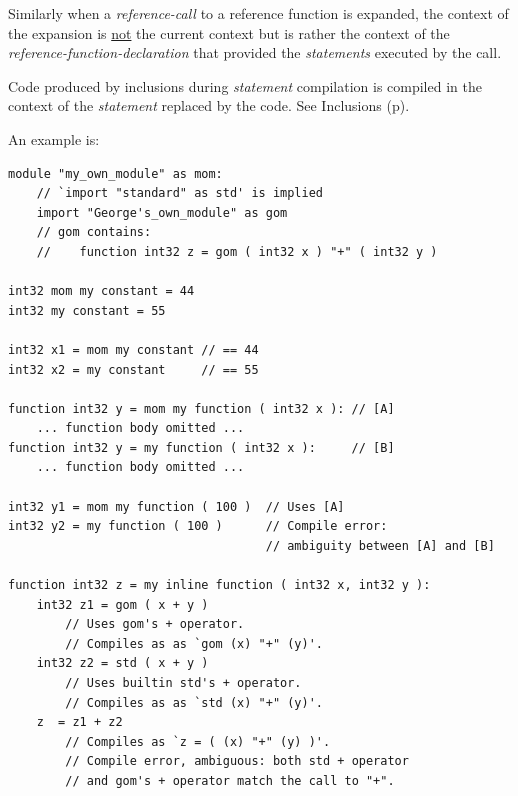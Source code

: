 \documentclass[12pt]{article}
\newcommand{\pagref}[1]{p\pageref{#1}}
\newenvironment{indpar}[1][0.3in]%
	{\begin{list}{}%
		     {\setlength{\itemsep}{0in}%
		      \setlength{\topsep}{0in}%
		      \setlength{\parsep}{1ex}%
		      \setlength{\labelwidth}{#1}%
		      \setlength{\leftmargin}{#1}%
		      \addtolength{\leftmargin}{\labelsep}}%
	 \item}%
	{\end{list}}
\begin{document}
Similarly when a {\em reference-call} to a reference function is expanded,
the context of the expansion is \underline{not} the current context but
is rather the context of the {\em reference-function-declaration}
that provided the {\em statements} executed by the call.

Code produced by inclusions during {\em statement} compilation
is compiled in the context of the {\em statement} replaced by the
code.  See Inclusions (\pagref{INCLUSIONS}).

An example is:
\begin{indpar}\begin{verbatim}
module "my_own_module" as mom:
    // `import "standard" as std' is implied
    import "George's_own_module" as gom
    // gom contains:
    //    function int32 z = gom ( int32 x ) "+" ( int32 y )

int32 mom my constant = 44
int32 my constant = 55

int32 x1 = mom my constant // == 44
int32 x2 = my constant     // == 55

function int32 y = mom my function ( int32 x ): // [A]
    ... function body omitted ...
function int32 y = my function ( int32 x ):     // [B]
    ... function body omitted ...

int32 y1 = mom my function ( 100 )  // Uses [A]
int32 y2 = my function ( 100 )      // Compile error:
                                    // ambiguity between [A] and [B]

function int32 z = my inline function ( int32 x, int32 y ):
    int32 z1 = gom ( x + y )
        // Uses gom's + operator.
        // Compiles as as `gom (x) "+" (y)'.
    int32 z2 = std ( x + y )
        // Uses builtin std's + operator.
        // Compiles as as `std (x) "+" (y)'.
    z  = z1 + z2
        // Compiles as `z = ( (x) "+" (y) )'.
        // Compile error, ambiguous: both std + operator
        // and gom's + operator match the call to "+".
\end{verbatim}\end{indpar}\label{EXTERNAL-INTERNAL-EXAMPLE}
\end{document}
